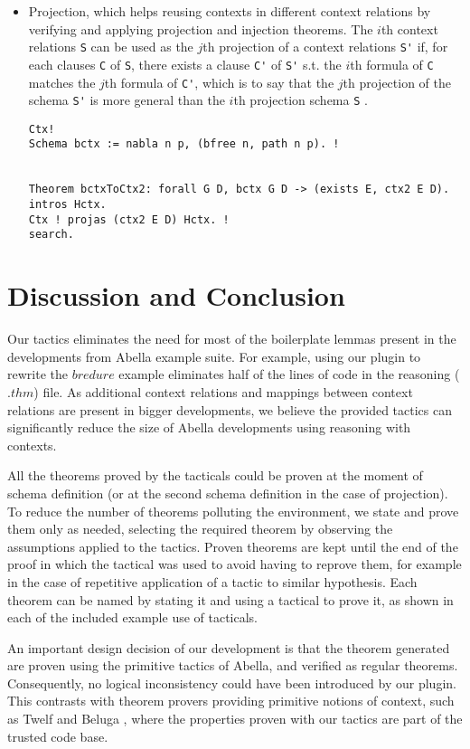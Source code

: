 \documentclass[nocopyrightspace,authoryear]{sigplanconf}
\begin{document}
\begin{itemize}
\item Projection, which helps reusing contexts in different context relations by verifying and applying projection and injection theorems. The $i$th context relations \lstinline|S| can be used as the $j$th projection of a context relations \lstinline|S'| if, for each clauses \lstinline|C| of \lstinline|S|, there exists a clause \lstinline|C'| of \lstinline|S'| s.t. the $i$th formula of \lstinline|C| matches the $j$th formula of \lstinline|C'|, which is to say that the $j$th projection of the schema \lstinline|S'| is more general than the $i$th projection schema \lstinline|S| .
\begin{lstlisting}
Ctx!
Schema bctx := nabla n p, (bfree n, path n p). !


Theorem bctxToCtx2: forall G D, bctx G D -> (exists E, ctx2 E D).
intros Hctx. 
Ctx ! projas (ctx2 E D) Hctx. ! 
search.
\end{lstlisting}


\end{itemize}

\section{Discussion and Conclusion}
Our tactics eliminates the need for most of the boilerplate lemmas present in the developments from Abella example suite. For example, using our plugin to rewrite the $bredure$ example eliminates half of the lines of code in the reasoning ($.thm$) file. As additional context relations and mappings between context relations are present in bigger developments, we believe the provided tactics can significantly reduce the size of Abella developments using reasoning with contexts.

All the theorems proved by the tacticals could be proven at the moment of schema definition (or at the second schema definition in the case of projection). To reduce the number of theorems polluting the environment, we state and prove them only as needed, selecting the required theorem by observing the assumptions applied to the tactics. Proven theorems are kept until the end of the proof in which the tactical was used to avoid having to reprove them, for example in the case of repetitive application of a tactic to similar hypothesis. Each theorem can be named by stating it and using a tactical to prove it, as shown in each of the included example use of tacticals.

An important design decision of our development is that the theorem generated are proven using the primitive tactics of Abella, and verified as regular theorems. Consequently, no logical inconsistency could have been introduced by our plugin. This contrasts with theorem provers providing primitive notions of context, such as Twelf \cite{twelfsys} and Beluga \cite{belugasys}, where the properties proven with our tactics are part of the trusted code base.
\end{document}
